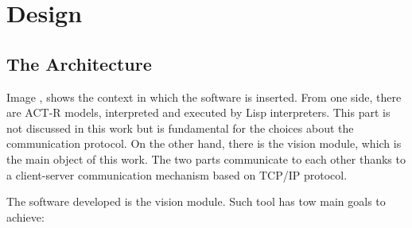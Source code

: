 \chapter{Design}\label{chDesign}
	
	\section{The Architecture}
	Image \todo{}, shows the context in which the software is inserted. 
	From one side, there are \mbox{ACT-R} models, interpreted and executed by \mbox{Lisp} interpreters. 
	This part is not discussed in this work but is fundamental for the choices about the communication protocol.
	On the other hand, there is the vision module, which is the main object of this work.
	The two parts communicate to each other thanks to a \mbox{client-server} communication mechanism based on \mbox{TCP/IP} protocol.

	The software developed is the vision module. Such tool has tow main goals to achieve: 
